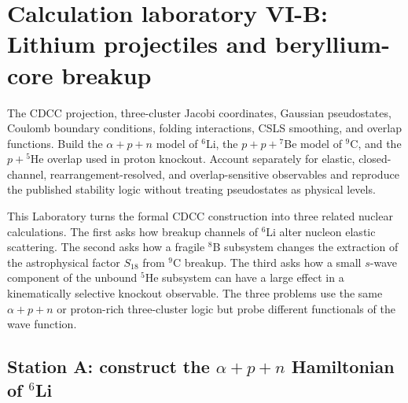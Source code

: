 \section{Calculation laboratory VI-B: Lithium projectiles and beryllium-core breakup}
\label{lab:lithium-beryllium}

\calculationroute
  {The CDCC projection, three-cluster Jacobi coordinates, Gaussian
  pseudostates, Coulomb boundary conditions, folding interactions, CSLS
  smoothing, and overlap functions.}
  {Build the $\alpha+p+n$ model of $^6$Li, the $p+p+{}^7$Be model of
  $^9$C, and the $p+{}^5$He overlap used in proton knockout.}
  {Account separately for elastic, closed-channel, rearrangement-resolved,
  and overlap-sensitive observables and reproduce the published stability
  logic without treating pseudostates as physical levels.}

This Laboratory turns the formal CDCC construction into three related nuclear
calculations.  The first asks how breakup channels of $^6$Li alter nucleon
elastic scattering.  The second asks how a fragile $^8$B subsystem changes the
extraction of the astrophysical factor $S_{18}$ from $^9$C breakup.  The third
asks how a small $s$-wave component of the unbound $^5$He subsystem can have a
large effect in a kinematically selective knockout observable.  The three
problems use the same $\alpha+p+n$ or proton-rich three-cluster logic but probe
different functionals of the wave function.

\subsection{Station A: construct the
\texorpdfstring{$\alpha+p+n$}{alpha+p+n} Hamiltonian of
\texorpdfstring{$^6$Li}{6Li}}
\label{subsec:lab-li6-structure}

